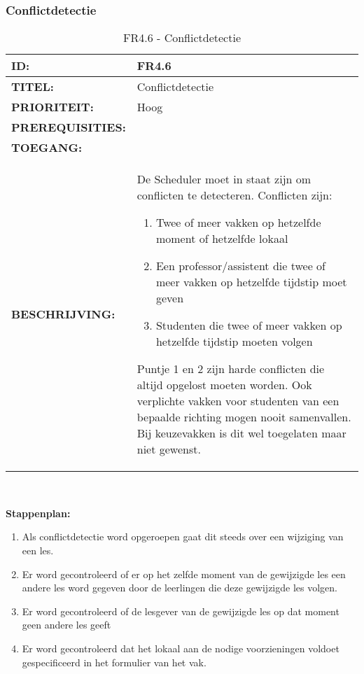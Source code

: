 \subsubsection{Conflictdetectie}        
\noindent\begin{table}[H]
            \begin{tabular}{l | p{10cm}}
                \textbf{ID:} & FR4.6 \\ \hline
                \textbf{TITEL:} & Conflictdetectie\\ \hline
                \textbf{PRIORITEIT:} & Hoog \\ \hline
                \textbf{PREREQUISITIES:} & \\ \hline
                \textbf{TOEGANG:} &  \\ \hline
                \textbf{BESCHRIJVING:} & De Scheduler moet in staat zijn om conflicten te detecteren. Conflicten zijn: 
                \begin{enumerate}
                \item Twee of meer vakken op hetzelfde moment of hetzelfde lokaal
                \item Een professor/assistent  die twee of meer vakken op hetzelfde tijdstip moet geven 
                \item Studenten die twee of meer vakken op hetzelfde tijdstip moeten volgen
                \end{enumerate}
                Puntje 1 en 2 zijn harde conflicten die altijd opgelost moeten worden. Ook verplichte vakken voor studenten van een bepaalde richting mogen nooit samenvallen. Bij keuzevakken is dit wel toegelaten maar niet gewenst.\\
            \end{tabular}\\
            \caption{FR4.6 - Conflictdetectie}
            \label{tab:FR4.6 - Conflictdetectie}
        \end{table}
        
\textbf{Stappenplan:}
	\begin{enumerate}
	\item Als conflictdetectie word opgeroepen gaat dit steeds over een wijziging van een les.
	\item Er word gecontroleerd of er op het zelfde moment van de gewijzigde les een andere les word gegeven door de leerlingen die deze gewijzigde les volgen.
	\item Er word gecontroleerd of de lesgever van de gewijzigde les op dat moment geen andere les geeft
	\item Er word gecontroleerd dat het lokaal aan de nodige voorzieningen voldoet gespecificeerd in het formulier van het vak. 
	\end{enumerate}
	


\clearpage